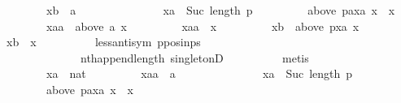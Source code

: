 \begin{isabellebody}
\ \ \ \ \ \ \ \ xb\ {\isacharcolon}{\kern0pt}{\isacharcolon}{\kern0pt}\ {\isachardoublequoteopen}{\isacharprime}{\kern0pt}a{\isachardoublequoteclose}\isanewline
\ \ \ \ \ \ \isamarkupfalse%
\isanewline
\ \ \ \ \ \ \ \ {\isachardoublequoteopen}xa\ {\isacharless}{\kern0pt}\ Suc\ {\isacharparenleft}{\kern0pt}length\ p{\isacharparenright}{\kern0pt}{\isachardoublequoteclose}\ \isanewline
\ \ \ \ \ \ \ \ {\isachardoublequoteopen}above\ {\isacharparenleft}{\kern0pt}{\isacharparenleft}{\kern0pt}p{\isacharat}{\kern0pt}{\isacharbrackleft}{\kern0pt}a{\isacharbrackright}{\kern0pt}{\isacharparenright}{\kern0pt}{\isacharbang}{\kern0pt}xa{\isacharparenright}{\kern0pt}\ x\ {\isacharequal}{\kern0pt}\ {\isacharbraceleft}{\kern0pt}x{\isacharbraceright}{\kern0pt}{\isachardoublequoteclose}\ \isanewline
\ \ \ \ \ \ \ \ {\isachardoublequoteopen}xaa\ {\isasymin}\ above\ a\ x{\isachardoublequoteclose}\ \isanewline
\ \ \ \ \ \ \ \ {\isachardoublequoteopen}xaa\ {\isasymnoteq}\ x{\isachardoublequoteclose}\ \isanewline
\ \ \ \ \ \ \ \ {\isachardoublequoteopen}xb\ {\isasymin}\ above\ {\isacharparenleft}{\kern0pt}p{\isacharbang}{\kern0pt}xa{\isacharparenright}{\kern0pt}\ x{\isachardoublequoteclose}\isanewline
\ \ \ \ \ \ \isamarkupfalse%
\ {\isachardoublequoteopen}xb\ {\isacharequal}{\kern0pt}\ x{\isachardoublequoteclose}\isanewline
\ \ \ \ \ \ \ \ \isamarkupfalse%
\ less{\isacharunderscore}{\kern0pt}antisym\ p{\isacharunderscore}{\kern0pt}pos{\isacharunderscore}{\kern0pt}in{\isacharunderscore}{\kern0pt}ps\isanewline
\ \ \ \ \ \ \ \ \ \ \ \ \ \ nth{\isacharunderscore}{\kern0pt}append{\isacharunderscore}{\kern0pt}length\ singletonD\isanewline
\ \ \ \ \ \ \ \ \isamarkupfalse%
\ metis\isanewline
\ \ \ \ \isamarkupfalse%
\isanewline
\ \ \ \ \ \ \isamarkupfalse%
\isanewline
\ \ \ \ \ \ \ \ xa\ {\isacharcolon}{\kern0pt}{\isacharcolon}{\kern0pt}\ nat\ \isanewline
\ \ \ \ \ \ \ \ xaa\ {\isacharcolon}{\kern0pt}{\isacharcolon}{\kern0pt}\ {\isachardoublequoteopen}{\isacharprime}{\kern0pt}a{\isachardoublequoteclose}\isanewline
\ \ \ \ \ \ \isamarkupfalse%
\isanewline
\ \ \ \ \ \ \ \ {\isachardoublequoteopen}xa\ {\isacharless}{\kern0pt}\ Suc\ {\isacharparenleft}{\kern0pt}length\ p{\isacharparenright}{\kern0pt}{\isachardoublequoteclose}\ \isanewline
\ \ \ \ \ \ \ \ {\isachardoublequoteopen}above\ {\isacharparenleft}{\kern0pt}{\isacharparenleft}{\kern0pt}p{\isacharat}{\kern0pt}{\isacharbrackleft}{\kern0pt}a{\isacharbrackright}{\kern0pt}{\isacharparenright}{\kern0pt}{\isacharbang}{\kern0pt}xa{\isacharparenright}{\kern0pt}\ x\ {\isacharequal}{\kern0pt}\ {\isacharbraceleft}{\kern0pt}x{\isacharbraceright}{\kern0pt}{\isachardoublequoteclose}\ \isanewline

\end{isabellebody}
